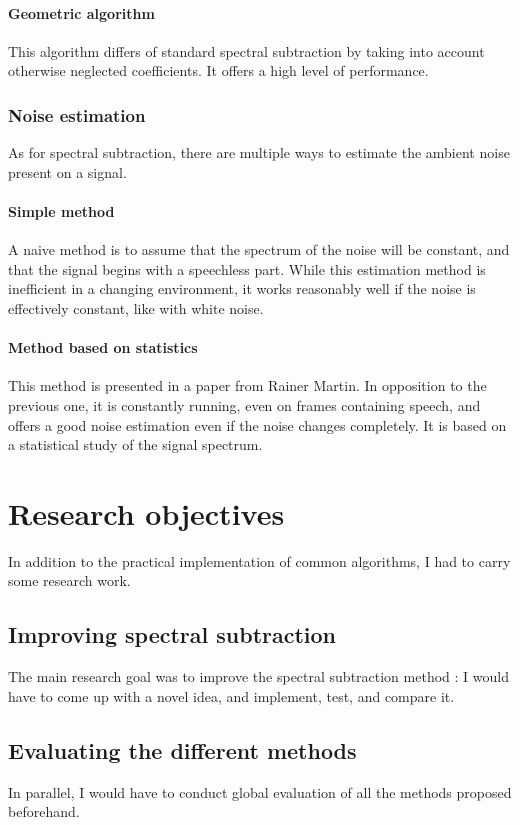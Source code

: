 \paragraph{Geometric algorithm}
This algorithm\cite{lu2008geometric} differs of standard spectral subtraction by taking into account otherwise neglected coefficients. It offers a high level of performance.
\subsubsection{Noise estimation}
As for spectral subtraction, there are multiple ways to estimate the ambient noise present on a signal.
\paragraph{Simple method}
A naive method is to assume that the spectrum of the noise will be constant, and that the signal begins with a speechless part. While this estimation method is inefficient in a changing environment, it works reasonably well if the noise is effectively constant, like with white noise.
\paragraph{Method based on statistics}
This method is presented in a paper from Rainer Martin\cite{martin2001noise}. In opposition to the previous one, it is constantly running, even on frames containing speech, and offers a good noise estimation even if the noise changes completely. It is based on a statistical study of the signal spectrum.
\section{Research objectives}
In addition to the practical implementation of common algorithms, I had to carry some research work.
\subsection{Improving spectral subtraction}
The main research goal was to improve the spectral subtraction method : I would have to come up with a novel idea, and implement, test, and compare it.
\subsection{Evaluating the different methods}
In parallel, I would have to conduct global evaluation of all the methods proposed beforehand.
